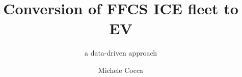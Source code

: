 \documentclass[%
   corpo=12pt, %
   oneside, %
   tipotesi=scudo,
   mybibliostyle, %
  numerazioneromana, %
   ]{toptesi}
\begin{document}
\begin{ThesisTitlePage}
\author{Michele Cocca}
\title{Conversion of FFCS ICE fleet to EV}
\subtitle{a data-driven approach}
%

\end{ThesisTitlePage}
\end{document}

